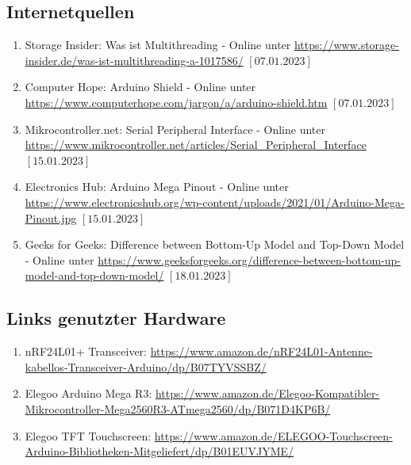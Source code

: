 \documentclass[a4paper, 11pt]{scrartcl}
\begin{document}
\subsection{Internetquellen}
\begin{enumerate}
    \item Storage Insider: Was ist Multithreading - Online unter \url{https://www.storage-insider.de/was-ist-multithreading-a-1017586/} $\left[\text{07.01.2023}\right]$ \label{itm:multithread}
    \item Computer Hope: Arduino Shield - Online unter \url{https://www.computerhope.com/jargon/a/arduino-shield.htm} $\left[\text{07.01.2023}\right]$ \label{itm:shield}
    \item Mikrocontroller.net: Serial Peripheral Interface - Online unter \url{https://www.mikrocontroller.net/articles/Serial_Peripheral_Interface} $\left[\text{15.01.2023}\right]$ \label{itm:SPI}
    \item Electronics Hub: Arduino Mega Pinout - Online unter \url{https://www.electronicshub.org/wp-content/uploads/2021/01/Arduino-Mega-Pinout.jpg} $\left[\text{15.01.2023}\right]$ \label{itm:pinout}
    \item Geeks for Geeks: Difference between Bottom-Up Model and Top-Down Model - Online unter \url{https://www.geeksforgeeks.org/difference-between-bottom-up-model-and-top-down-model/} 
    $\left[\text{18.01.2023}\right]$ \label{itm:bottom_up}
\end{enumerate}

\subsection{Links genutzter Hardware}\label{ch:hardwarelinks}
\begin{enumerate}
    \item nRF24L01+ Transceiver: \newline\url{https://www.amazon.de/nRF24L01-Antenne-kabellos-Transceiver-Arduino/dp/B07TYVSSBZ/}\label{itm:transceiverlink}
    \item Elegoo Arduino Mega R3: \newline\url{https://www.amazon.de/Elegoo-Kompatibler-Mikrocontroller-Mega2560R3-ATmega2560/dp/B071D4KP6B/}\label{itm:arduinolink}
    \item Elegoo TFT Touchscreen: \newline\url{https://www.amazon.de/ELEGOO-Touchscreen-Arduino-Bibliotheken-Mitgeliefert/dp/B01EUVJYME/}\label{itm:tftlink}
\end{enumerate}
\end{document}
